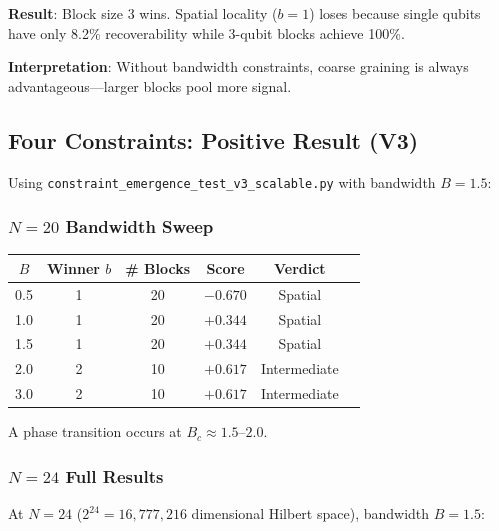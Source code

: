 \documentclass[11pt]{article}
\begin{document}
\textbf{Result}: Block size 3 wins. Spatial locality ($b=1$) loses because single 
qubits have only 8.2\% recoverability while 3-qubit blocks achieve 100\%.

\textbf{Interpretation}: Without bandwidth constraints, coarse graining is always 
advantageous---larger blocks pool more signal.

\subsection{Four Constraints: Positive Result (V3)}

Using \texttt{constraint\_emergence\_test\_v3\_scalable.py} with bandwidth $B=1.5$:

\subsubsection{$N=20$ Bandwidth Sweep}

\begin{center}
\begin{tabular}{cccccc}
\toprule
$B$ & Winner $b$ & \# Blocks & Score & Verdict \\
\midrule
0.5 & 1 & 20 & $-0.670$ & Spatial \\
1.0 & 1 & 20 & $+0.344$ & Spatial \\
1.5 & 1 & 20 & $+0.344$ & Spatial \\
\midrule
2.0 & 2 & 10 & $+0.617$ & Intermediate \\
3.0 & 2 & 10 & $+0.617$ & Intermediate \\
\bottomrule
\end{tabular}
\end{center}

A phase transition occurs at $B_c \approx 1.5$--$2.0$.

\subsubsection{$N=24$ Full Results}

At $N=24$ ($2^{24} = 16{,}777{,}216$ dimensional Hilbert space), bandwidth $B=1.5$:
\end{document}
